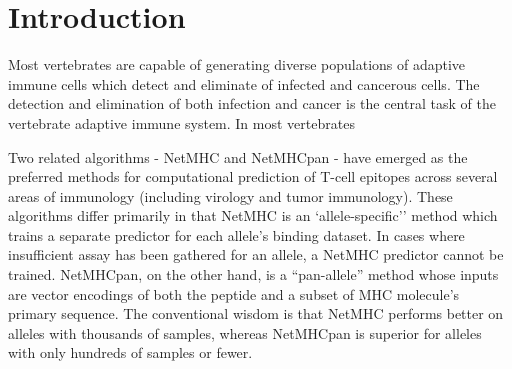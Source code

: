 \section{Introduction}
  
Most vertebrates are capable of generating diverse populations of adaptive immune cells which detect and eliminate of infected and cancerous cells.
The detection and elimination of both infection and cancer is the central task of the vertebrate adaptive immune system. 
In most vertebrates \cite{Anderson_2004}



Two related algorithms - NetMHC and NetMHCpan - have emerged as the preferred methods for computational prediction of T-cell epitopes across several areas of immunology (including virology\cite{Lund_2011} and tumor immunology\cite{Gubin_2015}). These algorithms differ primarily in that NetMHC is an `allele-specific'' method which trains a separate predictor for each allele's binding dataset. In cases where insufficient assay has been gathered for an allele, a NetMHC predictor cannot be trained. NetMHCpan, on the other hand, is a ``pan-allele'' method whose inputs are vector encodings of both the peptide and a subset of MHC molecule's primary sequence. The conventional wisdom is that NetMHC performs better on alleles with thousands of samples, whereas NetMHCpan is superior for alleles with only hundreds of samples or fewer. 


